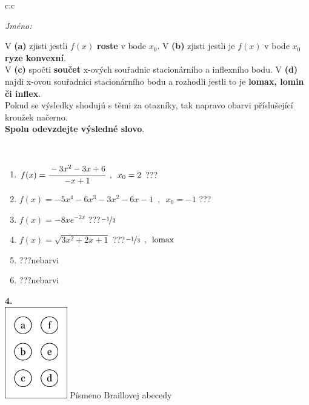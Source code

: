 \documentclass[10pt]{report}
\begin{document}
\begin{tabular}{c:c}
\begin{minipage}[c][104.5mm][t]{0.5\linewidth}
\begin{center}
\textit{Jméno:}\phantom{xxxxxxxxxxxxxxxxxxxxxxxxxxxxxxxxxxxxxxxxxxxxxxxxxxxxxxxxxxxxxxxxx}\\[5mm]
\begin{minipage}{0.95\linewidth}
\begin{center}
{\small V \textbf{(a)} zjisti jestli $f(x)$ \textbf{roste} v bode $x_0$. V \textbf{(b)} zjisti jestli je $f(x)$ v bode $x_0$ \textbf{ryze konvexní}.\\V \textbf{(c)} spočti \textbf{součet} x-ových souřadnic stacionárního a inflexního bodu. V \textbf{(d)} najdi x-ovou souřadnici stacionárního bodu a rozhodli jestli to je \textbf{lomax, lomin či inflex}.\\Pokud se výsledky shodujú s těmi za otazníky, tak napravo obarvi příslušející kroužek načerno.\\\textbf{Spolu odevzdejte výsledné slovo}}.
\end{center}
\end{minipage}
\\[1mm]
\begin{minipage}{0.79\linewidth}
\begin{center}
\begin{varwidth}{\linewidth}
\begin{enumerate}
\normalsize
\item $f(x)=\cfrac{-3x^2-3x+6}{-x+1}\enspace , \enspace x_0=2$\quad \dotfill\; ???\;\dotfill \quad {}
\item $f(x)=-5x^4-6x^3-3x^2-6x-1\enspace , \enspace x_0=-1$\quad \dotfill\; ???\;\dotfill \quad {}
\item $f(x)=-8xe^{-2x}$\quad \dotfill\; ???\;\dotfill \quad $\nicefrac{-1}{2}$
\item $f(x)=\sqrt{3x^2+2x+1}$\quad \dotfill\; ???\;\dotfill \quad $\nicefrac{-1}{3}\enspace , \enspace\mathrm{lomax}$
\item \quad \dotfill\; ???\;\dotfill \quad nebarvi
\item \quad \dotfill\; ???\;\dotfill \quad nebarvi
\end{enumerate}
\end{varwidth}
\end{center}
\end{minipage}
\begin{minipage}{0.20\linewidth}
\begin{center}
{\Huge\bfseries 4.} \\[2mm]
\includegraphics[height=40mm]{../images/braille.png}
{\small Písmeno Braillovej abecedy}
\end{center}
\end{minipage}
\end{center}
\end{minipage}
%
\end{tabular}
\end{document}

